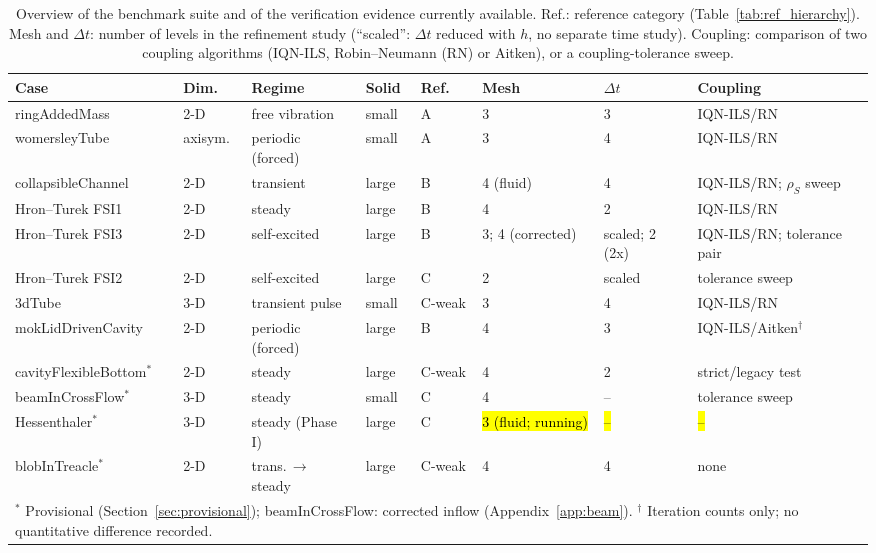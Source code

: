 \begin{table}[htbp]
	\centering
	\footnotesize
	\setlength{\tabcolsep}{3pt}
	\caption{Overview of the benchmark suite and of the verification evidence currently available. Ref.: reference category (Table~\ref{tab:ref_hierarchy}). Mesh and $\Delta t$: number of levels in the refinement study (``scaled'': $\Delta t$ reduced with $h$, no separate time study). Coupling: comparison of two coupling algorithms (IQN-ILS, Robin--Neumann (RN) or Aitken), or a coupling-tolerance sweep.}
	\label{tab:suite_overview}
	\begin{tabular}{llllllll}
		\toprule
		Case & Dim. & Regime & Solid & Ref. & Mesh & $\Delta t$ & Coupling \\
		\midrule
		ringAddedMass & 2-D & free vibration & small & A & 3 & 3 & IQN-ILS/RN \\
		womersleyTube & axisym. & periodic (forced) & small & A & 3 & 4 & IQN-ILS/RN \\
		collapsibleChannel & 2-D & transient & large & B & 4 (fluid) & 4 & IQN-ILS/RN; $\rho_S$ sweep \\
		Hron--Turek FSI1 & 2-D & steady & large & B & 4 & 2 & IQN-ILS/RN \\
		Hron--Turek FSI3 & 2-D & self-excited & large & B & 3; 4 (corrected) & scaled; 2 (2x) & IQN-ILS/RN; tolerance pair \\
		Hron--Turek FSI2 & 2-D & self-excited & large & C & 2 & scaled & tolerance sweep \\
		3dTube & 3-D & transient pulse & small & C-weak & 3 & 4 & IQN-ILS/RN \\
		mokLidDrivenCavity & 2-D & periodic (forced) & large & B & 4 & 3 & IQN-ILS/Aitken$^\dagger$ \\
		cavityFlexibleBottom$^\ast$ & 2-D & steady & large & C-weak & 4 & 2 & strict/legacy test \\
		beamInCrossFlow$^\ast$ & 3-D & steady & small & C & 4 & -- & tolerance sweep \\
		Hessenthaler$^\ast$ & 3-D & steady (Phase I) & large & C & \hl{3 (fluid; running)} & \hl{--} & \hl{--} \\
		blobInTreacle$^\ast$ & 2-D & trans.\,$\to$\,steady & large & C-weak & 4 & 4 & none \\
		\bottomrule
		\multicolumn{8}{l}{$^\ast$ Provisional (Section~\ref{sec:provisional}); beamInCrossFlow: corrected inflow (Appendix~\ref{app:beam}). $^\dagger$ Iteration counts only; no quantitative difference recorded.}
	\end{tabular}
\end{table}

